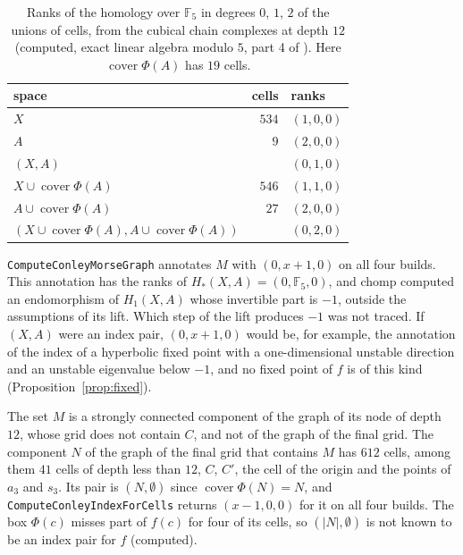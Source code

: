 \documentclass[11pt]{article}
\theoremstyle{plain}
\theoremstyle{definition}
\theoremstyle{remark}
\DeclareMathOperator{\cover}{cover}
\newcommand{\F}{\mathbb{F}_5}
\newcommand{\code}[1]{\texttt{#1}}
\begin{document}
\begin{table}[tbp]
\centering
\caption{Ranks of the homology over $\F$ in degrees $0$, $1$, $2$ of the unions of cells, from the cubical chain complexes at depth $12$ (computed, exact linear algebra modulo $5$, part 4 of ). Here $\cover\Phi(A)$ has $19$ cells.}\label{tab:ranks}
\begin{tabular}{lrl}
\toprule
space & cells & ranks \\
\midrule
$X$ & $534$ & $(1,0,0)$ \\
$A$ & $9$ & $(2,0,0)$ \\
$(X,A)$ & & $(0,1,0)$ \\
$X\cup\cover\Phi(A)$ & $546$ & $(1,1,0)$ \\
$A\cup\cover\Phi(A)$ & $27$ & $(2,0,0)$ \\
$(X\cup\cover\Phi(A),A\cup\cover\Phi(A))$ & & $(0,2,0)$ \\
\bottomrule
\end{tabular}
\end{table}

\code{ComputeConleyMorseGraph} annotates $M$ with $(0,x+1,0)$ on all four builds. This annotation has the ranks of $H_*(X,A)=(0,\F,0)$, and chomp computed an endomorphism of $H_1(X,A)$ whose invertible part is $-1$, outside the assumptions of its lift. Which step of the lift produces $-1$ was not traced. If $(X,A)$ were an index pair, $(0,x+1,0)$ would be, for example, the annotation of the index of a hyperbolic fixed point with a one-dimensional unstable direction and an unstable eigenvalue below $-1$, and no fixed point of $f$ is of this kind (Proposition~\ref{prop:fixed}).

The set $M$ is a strongly connected component of the graph of its node of depth $12$, whose grid does not contain $C$, and not of the graph of the final grid. The component $N$ of the graph of the final grid that contains $M$ has $612$ cells, among them $41$ cells of depth less than $12$, $C$, $C'$, the cell of the origin and the points of $a_3$ and $s_3$. Its pair is $(N,\emptyset)$ since $\cover\Phi(N)=N$, and \code{ComputeConleyIndexForCells} returns $(x-1,0,0)$ for it on all four builds. The box $\Phi(c)$ misses part of $f(c)$ for four of its cells, so $(|N|,\emptyset)$ is not known to be an index pair for $f$ (computed).
\end{document}
